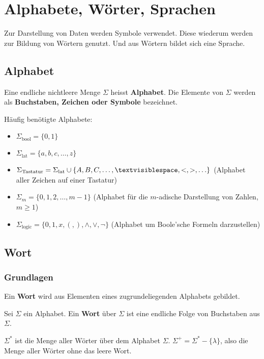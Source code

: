 \chapter{Alphabete, Wörter, Sprachen}
Zur Darstellung von Daten werden Symbole verwendet. Diese wiederum werden zur Bildung von Wörtern genutzt. Und aus Wörtern bildet sich eine Sprache.

\section{Alphabet}
\begin{definition}
Eine endliche nichtleere Menge $\Sigma$ heisst \textbf{Alphabet}. Die Elemente von $\Sigma$ werden als \textbf{Buchstaben, Zeichen oder Symbole} bezeichnet.
\end{definition}

Häufig benötigte Alphabete:
\begin{itemize}
    \item $\Sigma_\text{bool} = \{0,1\}$
    \item $\Sigma_\text{lat} = \{a, b, c, \ldots, z\}$
    \item $\Sigma_\text{Tastatur} = \Sigma_\text{lat} \cup \{A, B, C, \ldots, \textvisiblespace, <, >, \ldots\}$ (Alphabet aller Zeichen auf einer Tastatur)
    \item $\Sigma_m = \{0, 1, 2, \ldots, m - 1\}$ (Alphabet für die $m$-adische Darstellung von Zahlen, $m \geq 1$)
    \item $\Sigma_\text{logic} = \{0, 1, x, (, ), \land, \lor, \lnot\}$ (Alphabet um Boole'sche Formeln darzustellen)
\end{itemize}

\section{Wort}
\subsection{Grundlagen}
Ein \textbf{Wort} wird aus Elementen eines zugrundeliegenden Alphabets gebildet.\\

\begin{definition}
Sei $\Sigma$ ein Alphabet. Ein \textbf{Wort} über $\Sigma$ ist eine endliche Folge von Buchstaben aus $\Sigma$.\\
\end{definition}

\begin{remark}
$\Sigma^*$ ist die Menge aller Wörter über dem Alphabet $\Sigma$. $\Sigma^+ = \Sigma^* - \{\lambda\}$, also die Menge aller Wörter ohne das leere Wort.\\
\end{remark}


